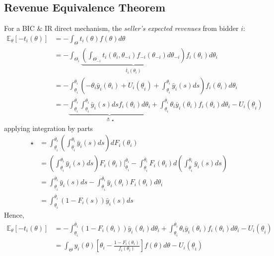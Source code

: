 \documentclass[11pt]{elegantbook}
\begin{document}
\subsection{Revenue Equivalence Theorem}
For a BIC $\&$ IR direct mechanism, the \textit{seller's expected revenues} from bidder $i$:
\begin{equation}
    \begin{aligned}
        \mathbb{E}_\theta[-t_i(\theta)]&=-\int_\Theta t_i(\theta)f(\theta) d\theta\\
        &=-\int_{\Theta_i} \underbrace{\left(\int_{\Theta_{-i}}t_i(\theta_i,\theta_{-i})f_{-i}(\theta_{-i})d\theta_{-i}\right)}_{\bar{t}_i(\theta_i)}f_i(\theta_i) d\theta_i\\
        &=-\int_{\underline{\theta}_i}^{\overline{\theta}_i}\left(-\theta_i \bar{y}_i(\theta_i)+U_i(\underline{\theta}_i)+\int_{\underline{\theta}_i}^{\theta_i}\bar{y}_i(s)ds\right)f_i(\theta_i) d\theta_i\\
        &=-\underbrace{\int_{\underline{\theta}_i}^{\overline{\theta}_i}\int_{\underline{\theta}_i}^{\theta_i}\bar{y}_i(s)dsf_i(\theta_i) d\theta_i}_{\triangleq \star}+\int_{\underline{\theta}_i}^{\overline{\theta}_i}\theta_i \bar{y}_i(\theta_i)f_i(\theta_i) d\theta_i-U_i(\underline{\theta}_i)
    \end{aligned}
    \nonumber
\end{equation}
applying integration by parts
\begin{equation}
    \begin{aligned}
        \star&=\int_{\underline{\theta}_i}^{\overline{\theta}_i}\left(\int_{\underline{\theta}_i}^{\theta_i}\bar{y}_i(s)ds\right)d F_i(\theta_i)\\
        &=\left(\int_{\underline{\theta}_i}^{\theta_i}\bar{y}_i(s)ds\right)F_i(\theta_i)\bigg|_{\underline{\theta}_i}^{\overline{\theta}_i}-\int_{\underline{\theta}_i}^{\overline{\theta}_i}F_i(\theta_i)d\left(\int_{\underline{\theta}_i}^{\theta_i}\bar{y}_i(s)ds\right)\\
        &=\int_{\underline{\theta}_i}^{\overline{\theta}_i}\bar{y}_i(s)ds-\int_{\underline{\theta}_i}^{\overline{\theta}_i}\bar{y}_i(\theta_i)F_i(\theta_i)d\theta_i\\
        &=\int_{\underline{\theta}_i}^{\overline{\theta}_i}(1-F_i(s))\bar{y}_i(s) ds
    \end{aligned}
    \nonumber
\end{equation}
Hence,
\begin{equation}
    \begin{aligned}
        \mathbb{E}_\theta[-t_i(\theta)]&=-\int_{\underline{\theta}_i}^{\overline{\theta}_i}(1-F_i(\theta_i))\bar{y}_i(\theta_i) d\theta_i+\int_{\underline{\theta}_i}^{\overline{\theta}_i}\theta_i \bar{y}_i(\theta_i)f_i(\theta_i) d\theta_i-U_i(\underline{\theta}_i)\\
        &=\int_\Theta y_i(\theta)\left[\theta_i-\frac{1-F_i(\theta_i)}{f_i(\theta_i)}\right]f(\theta)d\theta-U_i(\underline{\theta}_i)
    \end{aligned}
    \nonumber
\end{equation}
\end{document}

